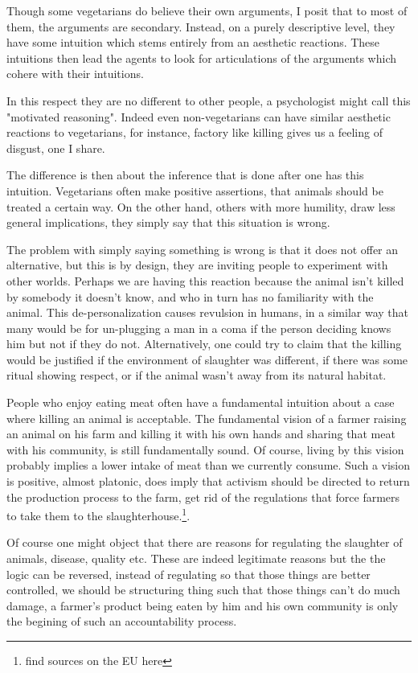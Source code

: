 \documentclass[12pt]{report}
\numberwithin{equation}{section}
\begin{document}
Though some vegetarians do believe their own arguments, I posit that to most of them, the arguments are secondary. Instead, on a purely descriptive level, they have some intuition which stems entirely from an aesthetic reactions. These intuitions then lead the agents to look for articulations of the arguments which cohere with their intuitions. 

In this respect they are no different to other people, a psychologist might call this "motivated reasoning". Indeed even non-vegetarians can have similar aesthetic reactions to vegetarians, for instance, factory like killing gives us a feeling of disgust, one I share. 

The difference is then about the inference that is done after one has this intuition. Vegetarians often make positive assertions, that animals should be treated a certain way. On the other hand, others with more humility, draw less general implications, they simply say that this situation is wrong. 

The problem with simply saying something is wrong is that it does not offer an alternative, but this is by design, they are inviting people to experiment with other worlds. Perhaps we are having this reaction because the animal isn't killed by somebody it doesn't know, and who in turn has no familiarity with the animal. This de-personalization causes revulsion in humans, in a similar way that many would be for un-plugging a man in a coma if the person deciding knows him but not if they do not. Alternatively, one could try to claim that the killing would be justified if the environment of slaughter was different, if there was some ritual showing respect, or if the animal wasn't away from its natural habitat. 

People who enjoy eating meat often have a fundamental intuition about a case where killing an animal is acceptable. The fundamental vision of a farmer raising an animal on his farm and killing it with his own hands and sharing that meat with his community, is still fundamentally sound. Of course, living by this vision probably implies a lower intake of meat than we currently consume. Such a vision is positive, almost platonic, does imply that activism should be directed to return the production process to the farm, get rid of the regulations that force farmers to take them to the slaughterhouse.\footnote{find sources on the EU here}. 

Of course one might object that there are reasons for regulating the slaughter of animals, disease, quality etc. These are indeed legitimate reasons but the the logic can be reversed, instead of regulating so that those things are better controlled, we should be structuring thing such that those things can't do much damage, a farmer's product being eaten by him and his own community is only the begining of such an accountability process. 
\end{document}
